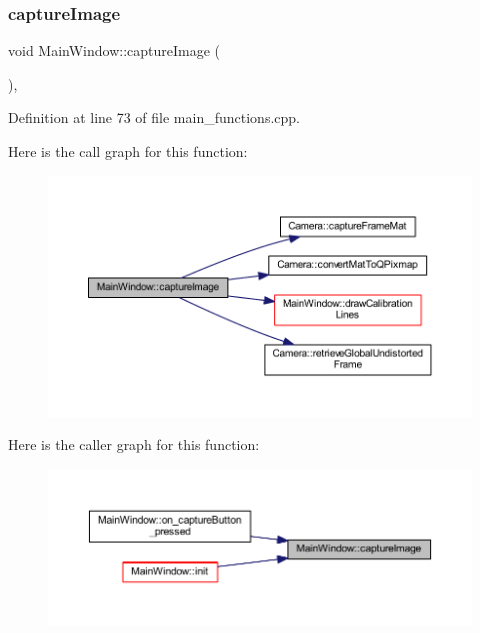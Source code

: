 \subsubsection{\texorpdfstring{captureImage}{captureImage}}
{\footnotesize\ttfamily void Main\+Window\+::capture\+Image (\begin{DoxyParamCaption}{ }\end{DoxyParamCaption})\hspace{0.3cm}{\ttfamily [private]}, {\ttfamily [slot]}}



Definition at line 73 of file main\+\_\+functions.\+cpp.

Here is the call graph for this function\+:
\nopagebreak
\begin{figure}[H]
\begin{center}
\leavevmode
\includegraphics[width=350pt]{class_main_window_a22df50c440a9aa974654f787d5935761_cgraph}
\end{center}
\end{figure}
Here is the caller graph for this function\+:
\nopagebreak
\begin{figure}[H]
\begin{center}
\leavevmode
\includegraphics[width=350pt]{class_main_window_a22df50c440a9aa974654f787d5935761_icgraph}
\end{center}
\end{figure}
\mbox{\label{class_main_window_a775d79cb8170d36faf4aa9ce4570d8b3}} 
